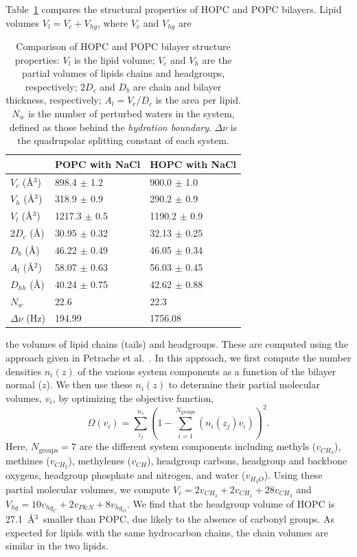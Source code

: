 \documentclass[12pt,openany,final]{book}
\begin{document}
Table~\ref{tab:struc} compares the structural properties of HOPC and POPC bilayers. 
Lipid volumes $V_l = V_c + V_{hg}$, where $V_c$ and $V_{hg}$ are 
\begin{table}[t]
    \caption[Comparison of HOPC and POPC bilayer structure properties.]{ 
Comparison of HOPC and POPC bilayer structure properties: $V_l$ is the lipid
volume; $V_c$ and $V_h$ are the partial volumes of lipids chains and headgroups,
respectively; $2D_c$ and $D_b$ are chain and bilayer thickness, respectively; $A_l=V_c/D_c$ is the area per lipid.
$N_{w}$ is the number of perturbed waters in the system, defined as those behind the \emph{hydration boundary}. $\Delta \nu$ is the quadrupolar splitting constant of each system.}
\label{tab:struc}
\begin{tabularx}{\textwidth}{X|X|X}%
& POPC with NaCl & HOPC with NaCl \\ \hline
$V_c$ (\AA$^3$) & 898.4 $\pm$ 1.2 & 900.0 $\pm$ 1.0   \\
$V_h$ (\AA$^3$) & 318.9 $\pm$ 0.9 & 290.2 $\pm$ 0.9   \\
$V_l$ (\AA$^3$) & 1217.3 $\pm$ 0.5 & 1190.2 $\pm$ 0.9   \\
$2D_c$ (\AA) & 30.95 $\pm$ 0.32 & 32.13 $\pm$ 0.25   \\
$D_b$ (\AA) & 46.22 $\pm$ 0.49 & 46.05 $\pm$ 0.34   \\
$A_l$ (\AA$^2$) & 58.07 $\pm$ 0.63 & 56.03 $\pm$ 0.45   \\
$D_{hh}$ (\AA) & 40.24 $\pm$ 0.75 & 42.62 $\pm$ 0.88   \\
$N_{w}$ & 22.6 & 22.3  \\ 
$\Delta \nu$ (Hz) & 194.99 & 1756.08 \\
\end{tabularx}
\end{table}
the volumes of lipid chains (tails) and headgroups. 
These are computed using the approach given in 
Petrache et al.~\cite{petrache:1997}. In this approach, 
we first compute the number densities $n_i(z)$ of the various system 
components as a function of the bilayer normal ($z$). We then use these 
$n_i(z)$ to determine their partial molecular volumes, $v_i$, by optimizing the objective function, 
\begin{equation}
\label{eq:petrache}
\Omega(v_i)=\sum^{n_s}_{z_j}(1-\sum_{i=1}^{N_{\text{groups}}}(n_i(z_j)v_i))^2.
\end{equation}
Here, $N_{\text{groups}}=7$ are the different system 
components including methyls ($v_{CH_3}$), methines ($v_{CH_2}$), 
methylenes ($v_{CH}$), headgroup carbons, headgroup and backbone oxygens, headgroup phosphate
and nitrogen, and water ($v_{H_2O}$). 
Using these partial molecular volumes, we compute 
$V_c = 2v_{CH_3} + 2v_{CH_1} + 28v_{CH_2}$ and $V_{hg} = 10v_{hg_C} + 2v_{P\text{\&}N} + 8v_{hg_O}$. 
We find that the headgroup volume of HOPC is 
27.1~\AA$^3$~smaller than POPC, due likely to the absence of carbonyl groups. 
As expected for lipids with the same
hydrocarbon chains, the chain volumes are similar in the two lipids.
\end{document}
